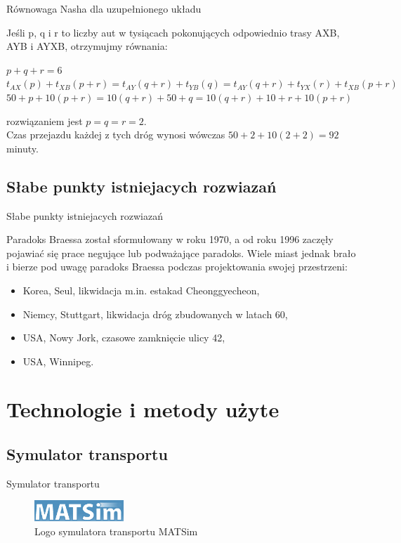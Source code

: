 \documentclass{beamer}
\begin{document}
\begin{frame}{Równowaga Nasha dla uzupełnionego układu\cite{braess}} 

Jeśli p, q i r to liczby aut w tysiącach pokonujących odpowiednio trasy AXB, AYB i AYXB, otrzymujmy równania:

\begin{center}
$p+q+r = 6 $\\
$t_{AX}(p)+t_{XB}(p+r) = t_{AY}(q+r) + t_{YB}(q) = t_{AY}(q+r)+t_{YX}(r)+t_{XB}(p+r)$
\newline\\
$50+p+10(p+r) = 10(q+r)+50+q = 10(q+r)+ 10 + r + 10(p+r)$
\end{center}
rozwiązaniem jest $p=q=r=2$.\\
Czas przejazdu każdej z tych dróg wynosi wówczas $50+2+10(2+2)=92$ minuty.
\end{frame}


\subsection{Słabe punkty istniejacych rozwiazań}
\begin{frame}{Słabe punkty istniejacych rozwiazań} 

Paradoks Braessa został sformułowany w roku 1970,
a od roku 1996 zaczęły pojawiać się prace negujące lub podważające paradoks\cite{newinsights}.
Wiele miast jednak brało i bierze pod uwagę paradoks Braessa podczas projektowania swojej przestrzeni:

\begin{itemize}
\item Korea, Seul, likwidacja m.in. estakad Cheonggyecheon,
\item Niemcy, Stuttgart, likwidacja dróg zbudowanych w latach 60,
\item USA, Nowy Jork, czasowe zamknięcie ulicy 42,
\item USA, Winnipeg.\cite{urban}
\end{itemize}  

\end{frame}


\section{Technologie i metody użyte}


\subsection{Symulator transportu}
\begin{frame}{Symulator transportu} 

	\begin{figure}[h!]
	\includegraphics[width=0.30\textwidth]{img/matsim}
	\caption{Logo symulatora transportu MATSim \cite{matsim}} 
	\end{figure}

\end{frame}
\end{document}
